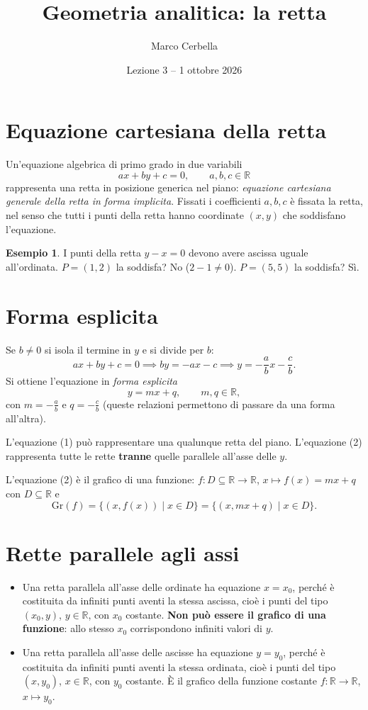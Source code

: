 \documentclass[11pt,a4paper]{article}
\title{Geometria analitica: la retta}
\author{Marco Cerbella}
\date{Lezione 3 -- 1 ottobre 2026}
\theoremstyle{definition}
\newtheorem*{esempio}{Esempio}
\begin{document}
\maketitle

\section{Equazione cartesiana della retta}

Un'equazione algebrica di primo grado in due variabili
\[
ax + by + c = 0, \qquad a, b, c \in \mathbb{R} \tag{1}
\]
rappresenta una retta in posizione generica nel piano: \emph{equazione cartesiana generale della retta in forma implicita}. Fissati i coefficienti $a, b, c$ è fissata la retta, nel senso che tutti i punti della retta hanno coordinate $(x, y)$ che soddisfano l'equazione.

\begin{esempio}
I punti della retta $y - x = 0$ devono avere ascissa uguale all'ordinata. $P = (1, 2)$ la soddisfa? No ($2 - 1 \neq 0$). $P = (5, 5)$ la soddisfa? Sì.
\end{esempio}

\section{Forma esplicita}

Se $b \neq 0$ si isola il termine in $y$ e si divide per $b$:
\[
ax + by + c = 0 \implies by = -ax - c \implies y = -\frac{a}{b}x - \frac{c}{b}.
\]
Si ottiene l'equazione in \emph{forma esplicita}
\[
y = mx + q, \qquad m, q \in \mathbb{R}, \tag{2}
\]
con $m = -\frac{a}{b}$ e $q = -\frac{c}{b}$ (queste relazioni permettono di passare da una forma all'altra).

L'equazione (1) può rappresentare una qualunque retta del piano. L'equazione (2) rappresenta tutte le rette \textbf{tranne} quelle parallele all'asse delle $y$.

L'equazione (2) è il grafico di una funzione: $f : D \subseteq \mathbb{R} \to \mathbb{R}$, $x \mapsto f(x) = mx + q$ con $D \subseteq \mathbb{R}$ e
\[
\mathrm{Gr}(f) = \{(x, f(x)) \mid x \in D\} = \{(x, mx + q) \mid x \in D\}.
\]

\section{Rette parallele agli assi}

\begin{itemize}
    \item Una retta parallela all'asse delle ordinate ha equazione $x = x_0$, perché è costituita da infiniti punti aventi la stessa ascissa, cioè i punti del tipo $(x_0, y)$, $y \in \mathbb{R}$, con $x_0$ costante. \textbf{Non può essere il grafico di una funzione}: allo stesso $x_0$ corrispondono infiniti valori di $y$.
    \item Una retta parallela all'asse delle ascisse ha equazione $y = y_0$, perché è costituita da infiniti punti aventi la stessa ordinata, cioè i punti del tipo $(x, y_0)$, $x \in \mathbb{R}$, con $y_0$ costante. È il grafico della funzione costante $f : \mathbb{R} \to \mathbb{R}$, $x \mapsto y_0$.
\end{itemize}
\end{document}

